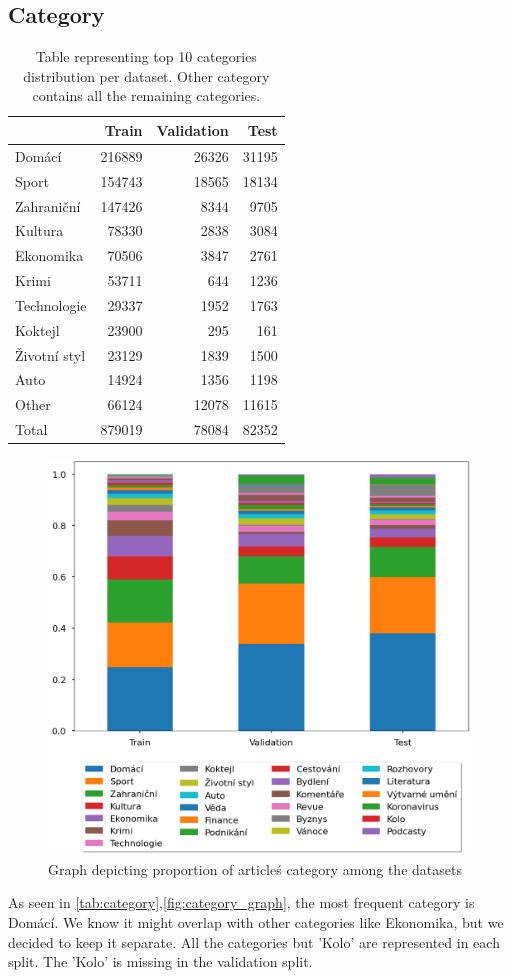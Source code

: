 \subsection{Category}
\begin{table}[h]
    \centering\footnotesize\sf
    \begin{tabular}{lrrr}
        \toprule
        {}           & Train  & Validation & Test  \\
        \midrule
        Domácí       & 216889 & 26326      & 31195 \\
        Sport        & 154743 & 18565      & 18134 \\
        Zahraniční   & 147426 & 8344       & 9705  \\
        Kultura      & 78330  & 2838       & 3084  \\
        Ekonomika    & 70506  & 3847       & 2761  \\
        Krimi        & 53711  & 644        & 1236  \\
        Technologie  & 29337  & 1952       & 1763  \\
        Koktejl      & 23900  & 295        & 161   \\
        Životní styl & 23129  & 1839       & 1500  \\
        Auto         & 14924  & 1356       & 1198  \\
        \midrule
        Other        & 66124  & 12078      & 11615 \\
        \midrule
        Total        & 879019 & 78084      & 82352 \\
        \bottomrule
    \end{tabular}
    \caption{Table representing top 10 categories distribution per dataset. Other category contains all the remaining categories.}
    \label{tab:category}
\end{table}
\begin{figure}[h]
    \centering
    \includegraphics[width=.6\linewidth]{img/tasks_graph/category.png}
    \caption{Graph depicting proportion of article\'s category among the datasets}
    \label{fig:category_graph}
\end{figure}
As seen in \autoref{tab:category},\autoref{fig:category_graph}, the most frequent category is Domácí.
We know it might overlap with other categories like Ekonomika, but we decided to keep it separate.
All the categories but 'Kolo' are represented in each split. The 'Kolo' is missing in the validation split.

